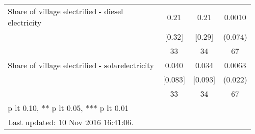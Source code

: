 \begin{table}[htbp]
\begin{tabular*}{0.9\hsize}{@{\hskip\tabcolsep\extracolsep\fill}l*{1}{ccc}}
Share of village electrified - diesel electricity&     0.21&     0.21&   0.0010         \\
                                &   [0.32]&   [0.29]&  (0.074)         \\
                                &       33&       34&       67         \\
Share of village electrified - solarelectricity&    0.040&    0.034&   0.0063         \\
                                &  [0.083]&  [0.093]&  (0.022)         \\
                                &       33&       34&       67         \\
\bottomrule
\multicolumn{4}{l}{\footnotesize * p lt 0.10, ** p lt 0.05, *** p lt 0.01}\\
\multicolumn{4}{l}{\footnotesize Last updated: 10 Nov 2016 16:41:06.}\\
\end{tabular*}
\end{table}
